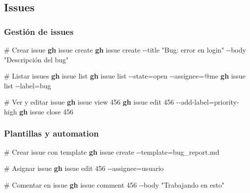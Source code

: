 \documentclass[
  11pt,
  letterpaper,
  oneside,
  openany]{scrbook}
\newenvironment{Shaded}{}{}
\newcommand{\AttributeTok}[1]{\textcolor[rgb]{0.84,0.23,0.29}{#1}}
\newcommand{\CommentTok}[1]{\textcolor[rgb]{0.42,0.45,0.49}{#1}}
\newcommand{\ExtensionTok}[1]{\textcolor[rgb]{0.84,0.23,0.29}{\textbf{#1}}}
\newcommand{\NormalTok}[1]{\textcolor[rgb]{0.14,0.16,0.18}{#1}}
\newcommand{\OperatorTok}[1]{\textcolor[rgb]{0.14,0.16,0.18}{#1}}
\newcommand{\StringTok}[1]{\textcolor[rgb]{0.01,0.18,0.38}{#1}}
\begin{document}
\subsection{Issues}\label{issues}

\subsubsection{Gestión de issues}\label{gestiuxf3n-de-issues}

\begin{Shaded}
\begin{Highlighting}[]
\CommentTok{\# Crear issue}
\ExtensionTok{gh}\NormalTok{ issue create}
\ExtensionTok{gh}\NormalTok{ issue create }\AttributeTok{{-}{-}title} \StringTok{"Bug: error en login"} \AttributeTok{{-}{-}body} \StringTok{"Descripción del bug"}

\CommentTok{\# Listar issues}
\ExtensionTok{gh}\NormalTok{ issue list}
\ExtensionTok{gh}\NormalTok{ issue list }\AttributeTok{{-}{-}state}\OperatorTok{=}\NormalTok{open }\AttributeTok{{-}{-}assignee}\OperatorTok{=}\NormalTok{@me}
\ExtensionTok{gh}\NormalTok{ issue list }\AttributeTok{{-}{-}label}\OperatorTok{=}\NormalTok{bug}

\CommentTok{\# Ver y editar issue}
\ExtensionTok{gh}\NormalTok{ issue view 456}
\ExtensionTok{gh}\NormalTok{ issue edit 456 }\AttributeTok{{-}{-}add{-}label}\OperatorTok{=}\NormalTok{priority{-}high}
\ExtensionTok{gh}\NormalTok{ issue close 456}
\end{Highlighting}
\end{Shaded}

\subsubsection{Plantillas y automation}\label{plantillas-y-automation}

\begin{Shaded}
\begin{Highlighting}[]
\CommentTok{\# Crear issue con template}
\ExtensionTok{gh}\NormalTok{ issue create }\AttributeTok{{-}{-}template}\OperatorTok{=}\NormalTok{bug\_report.md}

\CommentTok{\# Asignar issue}
\ExtensionTok{gh}\NormalTok{ issue edit 456 }\AttributeTok{{-}{-}assignee}\OperatorTok{=}\NormalTok{usuario}

\CommentTok{\# Comentar en issue}
\ExtensionTok{gh}\NormalTok{ issue comment 456 }\AttributeTok{{-}{-}body} \StringTok{"Trabajando en esto"}
\end{Highlighting}
\end{Shaded}
\end{document}
